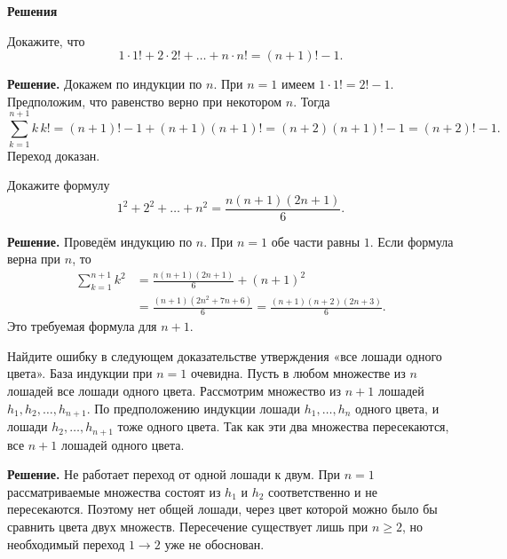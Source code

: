 

\ifPDFTeX
  \renewcommand{\rmdefault}{cmr}
\fi

\setlength{\emergencystretch}{2em}

\def\SheetNo{1}




\begin{center}\textbf{Решения}\end{center}

\begin{problems}

\item Докажите, что
\[
1\cdot 1!+2\cdot 2!+\ldots+n\cdot n!=(n+1)!-1.
\]
\par\smallskip\noindent\textbf{Решение.} Докажем по индукции по $n$. При $n=1$ имеем $1\cdot1!=2!-1$. Предположим, что равенство верно при некотором $n$. Тогда
\[
\sum_{k=1}^{n+1}k\,k!
=(n+1)!-1+(n+1)(n+1)!
=(n+2)(n+1)!-1
=(n+2)!-1.
\]
Переход доказан.\par

\item Докажите формулу
\[
1^2+2^2+\ldots+n^2=\frac{n(n+1)(2n+1)}{6}.
\]
\par\smallskip\noindent\textbf{Решение.} Проведём индукцию по $n$. При $n=1$ обе части равны $1$. Если формула верна при $n$, то
\[
\begin{aligned}
\sum_{k=1}^{n+1}k^2
&=\frac{n(n+1)(2n+1)}6+(n+1)^2\\
&=\frac{(n+1)(2n^2+7n+6)}6
=\frac{(n+1)(n+2)(2n+3)}6.
\end{aligned}
\]
Это требуемая формула для $n+1$.\par

\item Найдите ошибку в следующем доказательстве утверждения «все лошади одного цвета». База индукции при $n=1$ очевидна. Пусть в любом множестве из $n$ лошадей все лошади одного цвета. Рассмотрим множество из $n+1$ лошадей $h_1,h_2,\ldots,h_{n+1}$. По предположению индукции лошади $h_1,\ldots,h_n$ одного цвета, и лошади $h_2,\ldots,h_{n+1}$ тоже одного цвета. Так как эти два множества пересекаются, все $n+1$ лошадей одного цвета.
\par\smallskip\noindent\textbf{Решение.} Не работает переход от одной лошади к двум. При $n=1$ рассматриваемые множества состоят из $h_1$ и $h_2$ соответственно и не пересекаются. Поэтому нет общей лошади, через цвет которой можно было бы сравнить цвета двух множеств. Пересечение существует лишь при $n\ge2$, но необходимый переход $1\to2$ уже не обоснован.\par


\end{problems}
